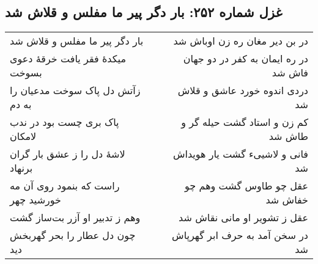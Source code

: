 \begin{center}
\section*{غزل شماره ۲۵۲: بار دگر پیر ما مفلس و قلاش شد}
\label{sec:252}
\begin{longtable}{l p{0.5cm} r}
بار دگر پیر ما مفلس و قلاش شد
&&
در بن دیر مغان ره زن اوباش شد
\\
میکدهٔ فقر یافت خرقهٔ دعوی بسوخت
&&
در ره ایمان به کفر در دو جهان فاش شد
\\
زآتش دل پاک سوخت مدعیان را به دم
&&
دردی اندوه خورد عاشق و قلاش شد
\\
پاک بری چست بود در ندب لامکان
&&
کم زن و استاد گشت حیله گر و طاش شد
\\
لاشهٔ دل را ز عشق بار گران برنهاد
&&
فانی و لاشییء گشت یار هویداش شد
\\
راست که بنمود روی آن مه خورشید چهر
&&
عقل چو طاوس گشت وهم چو خفاش شد
\\
وهم ز تدبیر او آزر بت‌ساز گشت
&&
عقل ز تشویر او مانی نقاش شد
\\
چون دل عطار را بحر گهربخش دید
&&
در سخن آمد به حرف ابر گهرپاش شد
\\
\end{longtable}
\end{center}
